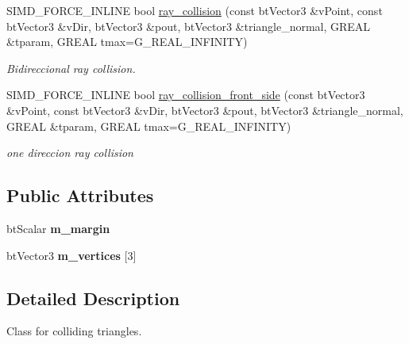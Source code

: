 \begin{DoxyCompactItemize}
\hypertarget{class_g_i_m___t_r_i_a_n_g_l_e_a2942ca686a994c2d112ad356c2a4e7ad}{S\+I\+M\+D\+\_\+\+F\+O\+R\+C\+E\+\_\+\+I\+N\+L\+I\+N\+E bool \hyperlink{class_g_i_m___t_r_i_a_n_g_l_e_a2942ca686a994c2d112ad356c2a4e7ad}{ray\+\_\+collision} (const bt\+Vector3 \&v\+Point, const bt\+Vector3 \&v\+Dir, bt\+Vector3 \&pout, bt\+Vector3 \&triangle\+\_\+normal, G\+R\+E\+A\+L \&tparam, G\+R\+E\+A\+L tmax=G\+\_\+\+R\+E\+A\+L\+\_\+\+I\+N\+F\+I\+N\+I\+T\+Y)}\label{class_g_i_m___t_r_i_a_n_g_l_e_a2942ca686a994c2d112ad356c2a4e7ad}

\begin{DoxyCompactList}\small\item\em Bidireccional ray collision. \end{DoxyCompactList}\item 
\hypertarget{class_g_i_m___t_r_i_a_n_g_l_e_a2b333284fd573994acf89b9085a61927}{S\+I\+M\+D\+\_\+\+F\+O\+R\+C\+E\+\_\+\+I\+N\+L\+I\+N\+E bool \hyperlink{class_g_i_m___t_r_i_a_n_g_l_e_a2b333284fd573994acf89b9085a61927}{ray\+\_\+collision\+\_\+front\+\_\+side} (const bt\+Vector3 \&v\+Point, const bt\+Vector3 \&v\+Dir, bt\+Vector3 \&pout, bt\+Vector3 \&triangle\+\_\+normal, G\+R\+E\+A\+L \&tparam, G\+R\+E\+A\+L tmax=G\+\_\+\+R\+E\+A\+L\+\_\+\+I\+N\+F\+I\+N\+I\+T\+Y)}\label{class_g_i_m___t_r_i_a_n_g_l_e_a2b333284fd573994acf89b9085a61927}

\begin{DoxyCompactList}\small\item\em one direccion ray collision \end{DoxyCompactList}\end{DoxyCompactItemize}
\subsection*{Public Attributes}
\begin{DoxyCompactItemize}
\item 
\hypertarget{class_g_i_m___t_r_i_a_n_g_l_e_a00e342655f73bea235450f154cc65091}{bt\+Scalar {\bfseries m\+\_\+margin}}\label{class_g_i_m___t_r_i_a_n_g_l_e_a00e342655f73bea235450f154cc65091}

\item 
\hypertarget{class_g_i_m___t_r_i_a_n_g_l_e_a436d4edc6252d62e352f9c09d2cbcddc}{bt\+Vector3 {\bfseries m\+\_\+vertices} \mbox{[}3\mbox{]}}\label{class_g_i_m___t_r_i_a_n_g_l_e_a436d4edc6252d62e352f9c09d2cbcddc}

\end{DoxyCompactItemize}


\subsection{Detailed Description}
Class for colliding triangles. 

